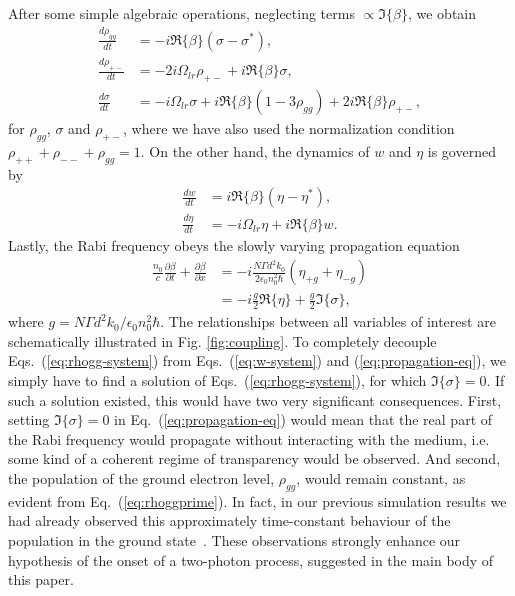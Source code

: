 \documentclass[onecolumn,secnumarabic,amssymb, nobibnotes, aip, prd]{revtex4-1}
\def\p{\partial}
\begin{document}
\begin{appendices}
After some simple algebraic operations, neglecting terms $\propto \Im \{\beta\}$, we obtain
\begin{subequations}
	\label{eq:rhogg-system}
	\begin{align}
	\frac{d \rho_{gg}}{dt} &= - i\Re\{\beta\}(\sigma-\sigma^*), \label{eq:rhoggprime} \\
	\frac{d \rho_{+-}}{dt} &= -2i\Omega_{lr}\rho_{+-}+i\Re\{\beta\}\sigma,\\
	\frac{d \sigma}{dt} &= -i\Omega_{lr}\sigma+i\Re\{\beta\}(1-3\rho_{gg})+2i\Re\{\beta\}\rho_{+-},
	\end{align}
\end{subequations}
for $\rho_{gg}$, $\sigma$ and $\rho_{+-}$, where we have also used the normalization condition ${\rho_{++}+\rho_{--}+\rho_{gg} = 1}$. On the other hand, the dynamics of $w$ and $\eta$ is governed by 
\begin{subequations}
\label{eq:w-system}
\begin{align}
\frac{d w}{dt} &= i\Re\{\beta\}(\eta-\eta^*), \\
\frac{d \eta}{dt} &= -i\Omega_{lr}\eta+i\Re\{\beta\} w. \label{eq:eta}
\end{align}
\end{subequations}
Lastly, the Rabi frequency obeys the slowly varying propagation equation \cite{jirauschek2014modeling}
\begin{align}
\label{eq:propagation-eq}
\frac{n_0}{c}\frac{\p \beta}{\p t} + \frac{\p \beta}{\p x} &= - i\frac{N\Gamma d^2 k_0}{2\epsilon_0n_0^2\hbar}(\eta_{+g}+\eta_{-g}) \nonumber \\
		&=  -i\frac{g}{2}\Re\{\eta\}+\frac{g}{2}\Im\{\sigma\},
\end{align}
where $g =N\Gamma d^2 k_0/\epsilon_0n_0^2\hbar $. The relationships between all variables of interest are schematically illustrated in Fig. \ref{fig:coupling}. 
To completely decouple Eqs.~(\ref{eq:rhogg-system}) from Eqs.~(\ref{eq:w-system}) and (\ref{eq:propagation-eq}), we simply have to find a solution of Eqs.~(\ref{eq:rhogg-system}), for which $\Im\{\sigma\} =0$. If such a solution existed, this would have two very significant consequences. First, setting $\Im\{\sigma\} =0$ in Eq.~(\ref{eq:propagation-eq}) would mean that the real part of the Rabi frequency would propagate without interacting with the medium, i.e. some kind of a coherent regime of transparency would be observed. And second, the population of the ground electron level, $\rho_{gg}$, would remain constant, as evident from Eq.~(\ref{eq:rhoggprime}). In fact, in our previous simulation results we had already observed this approximately time-constant behaviour of the population in the ground state~\cite{tzenov2017temporal}. These observations strongly enhance our hypothesis of the onset of a two-photon process, suggested in the main body of this paper.

\end{appendices}
\end{document}
